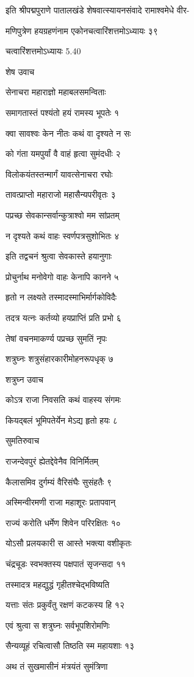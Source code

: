इति श्रीपद्मपुराणे पातालखंडे शेषवात्स्यायनसंवादे रामाश्वमेधे वीर-

मणिपुत्रेण हयग्रहणंनाम एकोनचत्वारिंशत्तमोऽध्यायः ३९

चत्वारिंशत्तमोऽध्यायः 5.40

शेष उवाच

सेनाचरा महाराज्ञो महाबलसमन्विताः

समागतास्तं पश्यंतो हयं रामस्य भूपतेः १

क्वा सावश्वः केन नीतः कथं वा दृश्यते न सः

को गंता यमपुर्यां वै वाहं हृत्वा सुमंदधीः २

विलोकयंतस्तन्मार्गं यावत्सेनाचरा रघोः

तावत्प्राप्तो महाराजो महासैन्यपरीवृतः ३

पप्रच्छ सेवकान्सर्वान्कुत्राश्वो मम सांप्रतम्

न दृश्यते कथं वाहः स्वर्णपत्रसुशोभितः ४

इति तद्वचनं श्रुत्वा सेवकास्ते हयानुगाः

प्रोचुर्नाथ मनोवेगो वाहः केनापि कानने ५

हृतो न लक्ष्यते तस्मादस्माभिर्मार्गकोविदैः

तदत्र यत्नः कर्तव्यो हयप्राप्तिं प्रति प्रभो ६

तेषां वचनमाकर्ण्य पप्रच्छ सुमतिं नृपः

शत्रुघ्नः शत्रुसंहारकारीमोहनरूपधृक् ७

शत्रुघ्न उवाच

कोऽत्र राजा निवसति कथं वाहस्य संगमः

कियद्बलं भूमिपतेर्येन मेऽद्य हृतो हयः ८

सुमतिरुवाच

राजन्देवपुरं ह्येतद्देवेनैव विनिर्मितम्

कैलासमिव दुर्गम्यं वैरिसंघैः सुसंहतैः ९

अस्मिन्वीरमणी राजा महाशूरः प्रतापवान्

राज्यं करोति धर्मेण शिवेन परिरक्षितः १०

योऽसौ प्रलयकारी स आस्ते भक्त्या वशीकृतः

चंद्रचूडः स्वभक्तस्य पक्षपातं सृजन्सदा ११

तस्मादत्र महद्युद्धं गृहीतश्चेद्भविष्यति

यत्ताः संतः प्रकुर्वंतु रक्षणं कटकस्य हि १२

एवं श्रुत्वा स शत्रुघ्नः सर्वभूपशिरोमणिः

सैन्यव्यूहं रचित्वासौ तिष्ठति स्म महायशाः १३

अथ तं सुखमासीनं मंत्रयंतं सुमंत्रिणा

